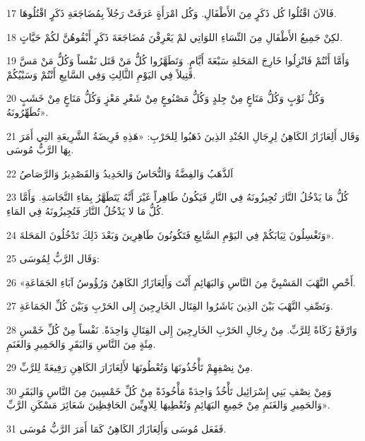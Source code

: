 \par 17 فَالآنَ اقْتُلُوا كُل ذَكَرٍ مِنَ الأَطْفَالِ. وَكُل امْرَأَةٍ عَرَفَتْ رَجُلاً بِمُضَاجَعَةِ ذَكَرٍ اقْتُلُوهَا.
\par 18 لكِنْ جَمِيعُ الأَطْفَالِ مِنَ النِّسَاءِ اللوَاتِي لمْ يَعْرِفْنَ مُضَاجَعَةَ ذَكَرٍ أَبْقُوهُنَّ لكُمْ حَيَّاتٍ.
\par 19 وَأَمَّا أَنْتُمْ فَانْزِلُوا خَارِجَ المَحَلةِ سَبْعَةَ أَيَّامٍ. وَتَطَهَّرُوا كُلُّ مَنْ قَتَل نَفْساً وَكُلُّ مَنْ مَسَّ قَتِيلاً فِي اليَوْمِ الثَّالِثِ وَفِي السَّابِعِ أَنْتُمْ وَسَبْيُكُمْ.
\par 20 وَكُلُّ ثَوْبٍ وَكُلُّ مَتَاعٍ مِنْ جِلدٍ وَكُلُّ مَصْنُوعٍ مِنْ شَعْرِ مَعْزٍ وَكُلُّ مَتَاعٍ مِنْ خَشَبٍ تُطَهِّرُونَهُ».
\par 21 وَقَال أَلِعَازَارُ الكَاهِنُ لِرِجَالِ الجُنْدِ الذِينَ ذَهَبُوا لِلحَرْبِ: «هَذِهِ فَرِيضَةُ الشَّرِيعَةِ التِي أَمَرَ بِهَا الرَّبُّ مُوسَى.
\par 22 اَلذَّهَبُ وَالفِضَّةُ وَالنُّحَاسُ وَالحَدِيدُ وَالقَصْدِيرُ وَالرَّصَاصُ
\par 23 كُلُّ مَا يَدْخُلُ النَّارَ تُجِيزُونَهُ فِي النَّارِ فَيَكُونُ طَاهِراً غَيْرَ أَنَّهُ يَتَطَهَّرُ بِمَاءِ النَّجَاسَةِ. وَأَمَّا كُلُّ مَا لا يَدْخُلُ النَّارَ فَتُجِيزُونَهُ فِي المَاءِ.
\par 24 وَتَغْسِلُونَ ثِيَابَكُمْ فِي اليَوْمِ السَّابِعِ فَتَكُونُونَ طَاهِرِينَ وَبَعْدَ ذَلِكَ تَدْخُلُونَ المَحَلةَ».
\par 25 وَقَال الرَّبُّ لِمُوسَى:
\par 26 «أَحْصِ النَّهْبَ المَسْبِيَّ مِنَ النَّاسِ وَالبَهَائِمِ أَنْتَ وَأَلِعَازَارُ الكَاهِنُ وَرُؤُوسُ آبَاءِ الجَمَاعَةِ.
\par 27 وَنَصِّفِ النَّهْبَ بَيْنَ الذِينَ بَاشَرُوا القِتَال الخَارِجِينَ إِلى الحَرْبِ وَبَيْنَ كُلِّ الجَمَاعَةِ.
\par 28 وَارْفَعْ زَكَاةً لِلرَّبِّ. مِنْ رِجَالِ الحَرْبِ الخَارِجِينَ إِلى القِتَالِ وَاحِدَةً. نَفْساً مِنْ كُلِّ خَمْسِ مِئَةٍ مِنَ النَّاسِ وَالبَقَرِ وَالحَمِيرِ وَالغَنَمِ.
\par 29 مِنْ نِصْفِهِمْ تَأْخُذُونَهَا وَتُعْطُونَهَا لأَلِعَازَارَ الكَاهِنِ رَفِيعَةً لِلرَّبِّ.
\par 30 وَمِنْ نِصْفِ بَنِي إِسْرَائِيل تَأْخُذُ وَاحِدَةً مَأْخُوذَةً مِنْ كُلِّ خَمْسِينَ مِنَ النَّاسِ وَالبَقَرِ وَالحَمِيرِ وَالغَنَمِ مِنْ جَمِيعِ البَهَائِمِ وَتُعْطِيهَا لِلاوِيِّينَ الحَافِظِينَ شَعَائِرَ مَسْكَنِ الرَّبِّ».
\par 31 فَفَعَل مُوسَى وَأَلِعَازَارُ الكَاهِنُ كَمَا أَمَرَ الرَّبُّ مُوسَى.
